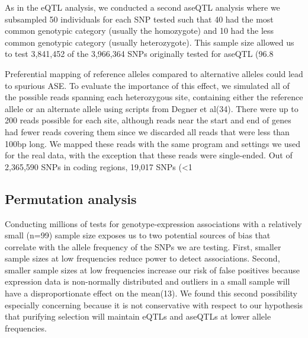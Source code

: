As in the eQTL analysis, we conducted a second aseQTL analysis where we subsampled 50 individuals for each SNP tested such that 40 had the most common genotypic category (usually the homozygote) and 10 had the less common genotypic category (usually heterozygote). This sample size allowed us to test 3,841,452 of the 3,966,364 SNPs originally tested for aseQTL (96.8%

Preferential mapping of reference alleles compared to alternative alleles could lead to spurious ASE. To evaluate the importance of this effect, we simulated all of the possible reads spanning each heterozygous site, containing either the reference allele or an alternate allele using scripts from Degner et al(34). There were up to 200 reads possible for each site, although reads near the start and end of genes had fewer reads covering them since we discarded all reads that were less than 100bp long. We mapped these reads with the same program and settings we used for the real data, with the exception that these reads were single-ended.  Out of 2,365,590 SNPs in coding regions, 19,017 SNPs (<1%

\subsection{Permutation analysis}
Conducting millions of tests for genotype-expression associations with a relatively small (n=99) sample size exposes us to two potential sources of bias that correlate with the allele frequency of the SNPs we are testing. First, smaller sample sizes at low frequencies reduce power to detect associations. Second, smaller sample sizes at low frequencies increase our risk of false positives because expression data is non-normally distributed and outliers in a small sample will have a disproportionate effect on the mean(13). We found this second possibility especially concerning because it is not conservative with respect to our hypothesis that purifying selection will maintain eQTLs and aseQTLs at lower allele frequencies. 

